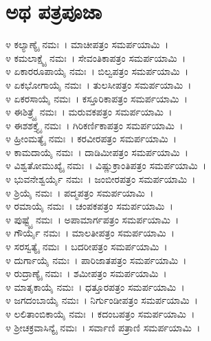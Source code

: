 \section{ಅಥ ಪತ್ರಪೂಜಾ}
೪ ಕಲ್ಯಾಣ್ಯೈ ನಮಃ~। ಮಾಚೀಪತ್ರಂ ಸಮರ್ಪಯಾಮಿ~।\\
೪ ಕಮಲಾಕ್ಷ್ಯೈ ನಮಃ~। ಸೇವಂತಿಕಾಪತ್ರಂ ಸಮರ್ಪಯಾಮಿ~।\\
೪ ಏಕಾರರೂಪಾಯೈ ನಮಃ~। ಬಿಲ್ವಪತ್ರಂ ಸಮರ್ಪಯಾಮಿ~।\\
೪ ಏಕಭೋಗಾಯೈ ನಮಃ~। ತುಲಸೀಪತ್ರಂ ಸಮರ್ಪಯಾಮಿ~।\\
೪ ಏಕರಸಾಯೈ ನಮಃ~। ಕಸ್ತೂರಿಕಾಪತ್ರಂ ಸಮರ್ಪಯಾಮಿ~।\\
೪ ಈಶಿತ್ರ್ಯೈ ನಮಃ~। ಮರುವಕಪತ್ರಂ ಸಮರ್ಪಯಾಮಿ~।\\
೪ ಈಶಶಕ್ತ್ಯೈ ನಮಃ~। ಗಿರಿಕರ್ಣಿಕಾಪತ್ರಂ ಸಮರ್ಪಯಾಮಿ~।\\
೪ ಹ್ರೀಂಮತ್ಯೈ ನಮಃ~। ಕರವೀರಪತ್ರಂ ಸಮರ್ಪಯಾಮಿ~।\\
೪ ಕಾಮದಾಯೈ ನಮಃ~। ದಾಡಿಮೀಪತ್ರಂ ಸಮರ್ಪಯಾಮಿ~।\\
೪ ವಿಶ್ವತೋಮುಖ್ಯೈ ನಮಃ~। ವಿಷ್ಣುಕ್ರಾಂತಿಪತ್ರಂ ಸಮರ್ಪಯಾಮಿ~।\\
೪ ಭುವನೇಶ್ವರ್ಯೈ ನಮಃ~। ಜಂಬೀರಪತ್ರಂ ಸಮರ್ಪಯಾಮಿ~।\\
೪ ಶ್ರಿಯೈ ನಮಃ~। ಪದ್ಮಪತ್ರಂ ಸಮರ್ಪಯಾಮಿ~।\\
೪ ರಮಾಯೈ ನಮಃ~। ಚಂಪಕಪತ್ರಂ ಸಮರ್ಪಯಾಮಿ~।\\
೪ ಪುಷ್ಟ್ಯೈ ನಮಃ~। ಅಪಾಮಾರ್ಗಪತ್ರಂ ಸಮರ್ಪಯಾಮಿ~।\\
೪ ಗೌರ್ಯೈ ನಮಃ~। ಮಾಲತೀಪತ್ರಂ ಸಮರ್ಪಯಾಮಿ~।\\
೪ ಸರಸ್ವತ್ಯೈ ನಮಃ~। ಬದರೀಪತ್ರಂ ಸಮರ್ಪಯಾಮಿ~।\\
೪ ದುರ್ಗಾಯೈ ನಮಃ~। ಪಾರಿಜಾತಪತ್ರಂ ಸಮರ್ಪಯಾಮಿ~।\\
೪ ರುದ್ರಾಣ್ಯೈ ನಮಃ~। ಶಮೀಪತ್ರಂ ಸಮರ್ಪಯಾಮಿ~।\\
೪ ಮಾತೃಕಾಯೈ ನಮಃ~। ಧತ್ತೂರಪತ್ರಂ ಸಮರ್ಪಯಾಮಿ~।\\
೪ ಜಗದಂಬಾಯೈ ನಮಃ~। ನಿರ್ಗುಂಡೀಪತ್ರಂ ಸಮರ್ಪಯಾಮಿ~।\\
೪ ಲಲಿತಾಂಬಿಕಾಯೈ ನಮಃ~। ಕದಂಬಪತ್ರಂ ಸಮರ್ಪಯಾಮಿ~।\\
೪ ಶ್ರೀಚಕ್ರವಾಸಿನ್ಯೈ ನಮಃ~। ಸರ್ವಾಣಿ ಪತ್ರಾಣಿ ಸಮರ್ಪಯಾಮಿ~।
